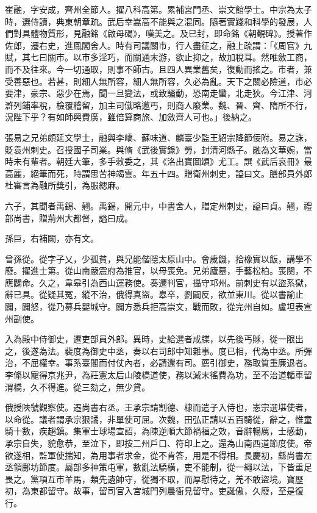 
\begin{pinyinscope}

 崔融，字安成，齊州全節人。擢八科高第。累補宮門丞、崇文館學士。中宗為太子時，選侍讀，典東朝章疏。武后幸嵩高不能與之混同。隨著實踐和科學的發展，人們對具體物質形，見融銘《啟母碣》，嘆美之。及已封，即命銘《朝覲碑》。授著作佐郎，遷右史，進鳳閣舍人。時有司議關市，行人盡征之，融上疏謂：「《周官》九賦，其七曰關市。以市多淫巧，而關通末游，欲止抑之，故加稅耳。然唯斂工商，而不及往來。今一切通取，則事不師古。且四人異業舊矣，復動而搖之。市者，兼受善惡也。若甚，則細人無所容，細人無所容，久必為亂。天下之關必險道，市必要津，豪宗、惡少在焉，聞一旦變法，或致騷動，恐南走蠻，北走狄。今江津、河滸列鋪率稅，檢覆稽留，加主司僦略邀丐，則商人廢業。魏、晉、齊、隋所不行，況陛下乎？有如師興費廣，雖倍算商旅、加斂齊人可也。」後納之。



 張易之兄弟頗延文學士，融與李嶠、蘇味道、麟臺少監王紹宗降節佞附。易之誅，貶袁州刺史。召授國子司業。與脩《武後實錄》勞，封清河縣子。融為文華婉，當時未有輩者。朝廷大筆，多手敕委之，其《洛出寶圖頌》尤工。譔《武后哀冊》最高麗，絕筆而死，時謂思苦神竭雲。年五十四。贈衛州刺史，謚曰文。膳部員外郎杜審言為融所獎引，為服緦麻。



 六子，其聞者禹錫、翹。禹錫，開元中，中書舍人，贈定州刺史，謚曰貞。翹，禮部尚書，贈荊州大都督，謚曰成。



 孫巨，右補闕，亦有文。



 曾孫從。從字子乂，少孤貧，與兄能偕隱太原山中。會歲饑，拾橡實以飯，講學不廢。擢進士第。從山南嚴震府為推官，以母喪免。兄弟廬墓，手藝松柏。喪闋，不應闢命。久之，韋皋引為西山運務使。奏遷判官，攝守邛州。前刺史有以盜系獄，辭已具。從疑其冤，縱不治，俄得真盜。皋卒，劉闢反，欲並東川。從以書諭止闢，闢怒，從乃募兵嬰城守。闢方悉兵拒高崇文，戰而敗，從完州自如。盧坦表宣州副使。



 入為殿中侍御史，遷吏部員外郎。異時，史給選者成牒，以先後丐賕，從一限出之，後遂為法。裴度為御史中丞，奏以右司郎中知雜事。度已相，代為中丞。所彈治，不屈權幸。事系臺閣而付仗內者，必請還有司。薦引御史，務取質重廉退者。李翛以寵得京兆尹，為莊憲太后山陵橋道使，務以減末徭費為功，至不治道輴車留渭橋，久不得進。從三劾之，無少貸。



 俄授陜虢觀察使。遷尚書右丞。王承宗請割德、棣而遣子入侍也，憲宗選堪使者，以命從。議者謂承宗狠譎，非單使可屈。次魏，田弘正請以五百騎從，辭之，惟童騎十數，疾趨鎮。集軍士球場宣詔，為陳逆順大節禍福之效，音辭暢厲，士感動，承宗自失，貌愈恭，至泣下，即按二州戶口、符印上之。還為山南西道節度使。帝欲遂相，監軍使揣知，為用事者求金，從不肯答，用是不得相。長慶初，繇尚書左丞領鄜坊節度。屬部多神策屯軍，數亂法驕橫，吏不能制，從一繩以法，下皆重足畏之。黨項互市羊馬，類先遺帥守，從獨不取，而厚慰待之，羌不敢盜境。寶歷初，為東都留守。故事，留司官入宮城門列晨衙見留守。吏誕傲，久廢，至是復行。




\end{pinyinscope}
